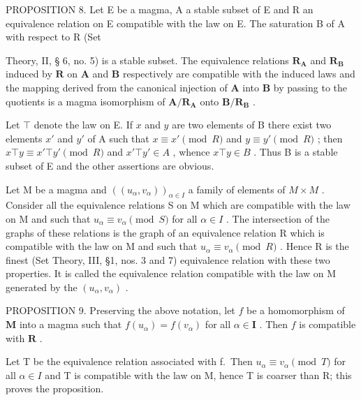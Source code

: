 PROPOSITION 8. Let E be a magma, A a stable subset of E and R an equivalence relation on E compatible with the law on E. The saturation B of A with respect to R (Set

Theory, II, § 6, no. 5) is a stable subset. The equivalence relations \(\mathbf{R}_{\mathbf{A}}\) and \(\mathbf{R}_{\mathbf{B}}\) induced by \(\mathbf{R}\) on \(\mathbf{A}\) and \(\mathbf{B}\) respectively are compatible with the induced laws and the mapping derived from the canonical injection of \(\mathbf{A}\) into \(\mathbf{B}\) by passing to the quotients is a magma isomorphism of \(\mathbf{A} / \mathbf{R}_{\mathbf{A}}\) onto \(\mathbf{B} / \mathbf{R}_{\mathbf{B}}\) .

Let \(\top\) denote the law on E. If \(x\) and \(y\) are two elements of B there exist two elements \(x'\) and \(y'\) of A such that \(x \equiv x' \pmod{R}\) and \(y \equiv y' \pmod{R}\) ; then \(x \top y \equiv x' \top y' \pmod{R}\) and \(x' \top y' \in A\) , whence \(x \top y \in B\) . Thus B is a stable subset of E and the other assertions are obvious.

Let M be a magma and \(((u_{\alpha}, v_{\alpha}))_{\alpha \in I}\) a family of elements of \(M \times M\) . Consider all the equivalence relations S on M which are compatible with the law on M and such that \(u_{\alpha} \equiv v_{\alpha} \pmod{S}\) for all \(\alpha \in I\) . The intersection of the graphs of these relations is the graph of an equivalence relation R which is compatible with the law on M and such that \(u_{\alpha} \equiv v_{\alpha} \pmod{R}\) . Hence R is the finest (Set Theory, III, §1, nos. 3 and 7) equivalence relation with these two properties. It is called the equivalence relation compatible with the law on M generated by the \((u_{\alpha}, v_{\alpha})\) .

PROPOSITION 9. Preserving the above notation, let \(f\) be a homomorphism of \(\mathbf{M}\) into a magma such that \(f(u_{\alpha}) = f(v_{\alpha})\) for all \(\alpha \in \mathbf{I}\) . Then \(f\) is compatible with \(\mathbf{R}\) .

Let T be the equivalence relation associated with f.~Then \(u_{\alpha} \equiv v_{\alpha} \pmod{T}\) for all \(\alpha \in I\) and T is compatible with the law on M, hence T is coarser than R; this proves the proposition.

